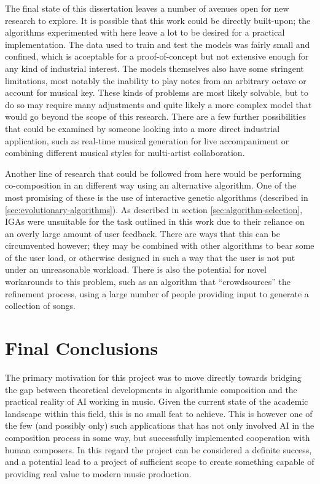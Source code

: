 \documentclass[ author={Stephen Livermore-Tozer},
				supervisor={Dr. Peter Flach},
				degree={MEng},
				title={Algorithmic Co-composition Using Machine Learning},
				subtitle={},
				type={research},
				year={2016} ]{dissertation}
\begin{document}
	The final state of this dissertation leaves a number of avenues open for new research to explore. It is possible that this work could be directly built-upon; the algorithms experimented with here leave a lot to be desired for a practical implementation. The data used to train and test the models was fairly small and confined, which is acceptable for a proof-of-concept but not extensive enough for any kind of industrial interest. The models themselves also have some stringent limitations, most notably the inability to play notes from an arbitrary octave or account for musical key. These kinds of problems are most likely solvable, but to do so may require many adjustments and quite likely a more complex model that would go beyond the scope of this research. There are a few further possibilities that could be examined by someone looking into a more direct industrial application, such as real-time musical generation for live accompaniment or combining different musical styles for multi-artist collaboration.
	
	Another line of research that could be followed from here would be performing co-composition in an different way using an alternative algorithm. One of the most promising of these is the use of interactive genetic algorithms (described in \ref{sec:evolutionary-algorithms}). As described in section \ref{sec:algorithm-selection}, IGAs were unsuitable for the task outlined in this work due to their reliance on an overly large amount of user feedback. There are ways that this can be circumvented however; they may be combined with other algorithms to bear some of the user load, or otherwise designed in such a way that the user is not put under an unreasonable workload. There is also the potential for novel workarounds to this problem, such as an algorithm that ``crowdsources'' the refinement process, using a large number of people providing input to generate a collection of songs.  
	
	\section{Final Conclusions}
	
	The primary motivation for this project was to move directly towards bridging the gap between theoretical developments in algorithmic composition and the practical reality of AI working in music. Given the current state of the academic landscape within this field, this is no small feat to achieve. This is however one of the few (and possibly only) such applications that has not only involved AI in the composition process in some way, but successfully implemented cooperation with human composers. In this regard the project can be considered a definite success, and a potential lead to a project of sufficient scope to create something capable of providing real value to modern music production.
\end{document}
